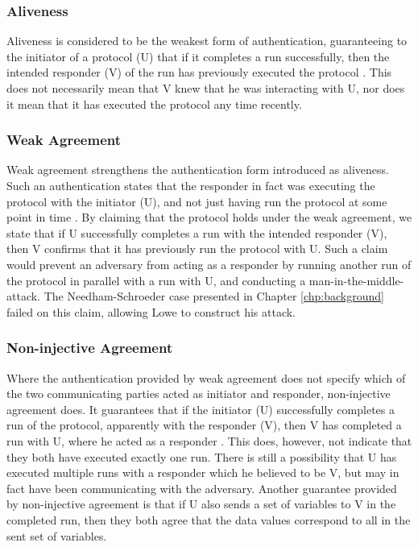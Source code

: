\subsubsection{Aliveness}

Aliveness is considered to be the weakest form of authentication, guaranteeing to the initiator of a protocol (U) that if it completes a run successfully, then the intended responder (V) of the run has previously executed the protocol \cite{lowe1997hierarchy}. This does not necessarily mean that V knew that he was interacting with U, nor does it mean that it has executed the protocol any time recently. 


\subsubsection{Weak Agreement}

Weak agreement strengthens the authentication form introduced as aliveness. Such an authentication states that the responder in fact was executing the protocol with the initiator (U), and not just having run the protocol at some point in time \cite{lowe1997hierarchy}. By claiming that the protocol holds under the weak agreement, we state that if U successfully completes a run with the intended responder (V), then V confirms that it has previously run the protocol with U. Such a claim would prevent an adversary from acting as a responder by running another run of the protocol in parallel with a run with U, and conducting a man-in-the-middle-attack. The Needham-Schroeder case presented in Chapter \ref{chp:background} failed on this claim, allowing Lowe to construct his attack. 


\subsubsection{Non-injective Agreement}

Where the authentication provided by weak agreement does not specify which of the two communicating parties acted as initiator and responder, non-injective agreement does. It guarantees that if the initiator (U) successfully completes a run of the protocol, apparently with the responder (V), then V has completed a run with U, where he acted as a responder \cite{lowe1997hierarchy}. This does, however, not indicate that they both have executed exactly one run. There is still a possibility that U has executed multiple runs with a responder which he believed to be V, but may in fact have been communicating with the adversary. Another guarantee provided by non-injective agreement is that if U also sends a set of variables to V in the completed run, then they both agree that the data values correspond to all in the sent set of variables.

